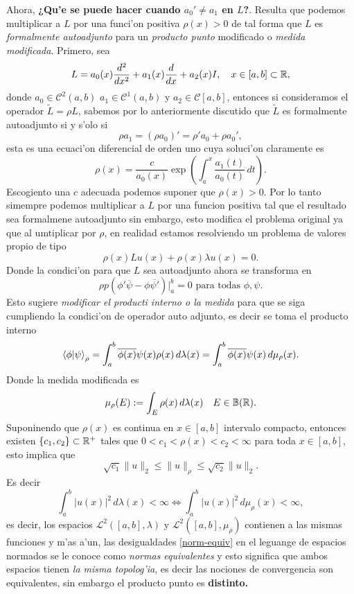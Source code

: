 \documentclass[main.tex]{subfiles}
\begin{document}
\noindent Ahora, \textbf{¿Qu'e se puede hacer cuando $a_{0}'\neq a_{1}$ en $L$?}. Resulta que podemos multiplicar a $L$ por una funci'on positiva $\rho(x)>0$ de tal forma que $L$ es \emph{formalmente autoadjunto} para un \emph{producto punto} modificado o \emph{medida modificada}. Primero, sea
\[
L=a_0(x)\frac{d^2}{dx^2}+a_1(x)\frac{d}{dx}+a_2(x)I,\quad x\in [a,b]\subset\mathbb R ,
\]
\noindent donde $a_{0}\in\mathcal{C}^{2}(a,b)$ $a_{1}\in\mathcal{C}^{1}(a,b)$ y $a_{2}\in\mathcal{C}[a,b]$, entonces si consideramos el operador $\tilde{L}=\rho L$, sabemos por lo anteriormente discutido que $\tilde{L}$ es formalmente autoadjunto si y s'olo si
\[
  \rho a_{1}=(\rho a_{0})'=\rho'a_{0}+\rho a_{0}',
\]
esta es una ecuaci'on diferencial de orden uno cuya soluci'on claramente es
\[
  \rho(x)=\frac{c}{a_{0}(x)}\exp\left(\int_{a}^{x}\frac{a_{1}(t)}{a_{0}(t)}\,dt\right).
\]
Escogiento una $c$ adecuada podemos suponer que $\rho(x)>0$. Por lo tanto simempre podemos multiplicar a $L$ por una funcion positiva tal que el resultado sea formalmene autoadjunto sin embargo, esto modifica el problema original ya que al umtiplicar por $\rho$, en realidad estamos resolviendo un problema de valores propio de tipo
\[
  \rho(x)Lu(x)+\rho(x)\lambda u(x)=0.
\]
\noindent Donde la condici'on para que $L$ sea autoadjunto ahora se transforma en
\[
  \rho p(\phi'\overline{\psi}-\phi\overline{\psi'})|_{a}^{b}=0\text{ para todas }\phi,\psi.
\]
Esto sugiere \emph{modificar el producti interno o  la medida} para que se siga cumpliendo la condici'on de operador auto adjunto, es decir se toma el producto interno
\begin{equation} \braket{\phi|\psi}_{\rho}=\int_{a}^{b}\overline{\phi(x)}\psi(x)\rho(x)\,d\lambda(x)=\int_{a}^{b}\overline{\phi(x)}\psi(x)\,d\mu_{\rho}(x).
\end{equation}
\noindent Donde la medida modificada es
\[
  \mu_{\rho}(E):=\int_{E}\rho(x)\,d\lambda(x)\quad E\in\mathbb{B}(\mathbb R ).
\]
\obs Suponinendo que $\rho(x)$ es continua en $x\in[a,b]$ intervalo compacto, entonces existen $\{c_{1},c_{2}\}\subset\mathbb R ^{+}$ tales que $0<c_{1}<\rho(x)<c_{2}<\infty$ para toda $x\in[a,b]$, esto implica que
\begin{equation}\label{norm-equiv}
  \sqrt{c_{1}}\|u\|_{2}\leq\|u\|_{\rho}\leq\sqrt{c_{2}}\|u\|_{2}.
\end{equation}
Es decir
\[
  \int_{a}^{b}|u(x)|^{2}\,d\lambda(x)<\infty\iff \int_{a}^{b}|u(x)|^{2}\,d\mu_{\rho}(x)<\infty,
\]
es decir, los espacios $\mathcal{L}^{2}([a,b],\lambda)$ y $\mathcal{L}^{2}([a,b],\mu_{\rho})$ contienen a las mismas funciones y m'as a'un, las desigualdades \ref{norm-equiv} en el leguange de espacios normados se le conoce como \emph{normas equivalentes} y esto significa que ambos espacios tienen \emph{la misma topolog'ia}, es decir las nociones de convergencia son equivalentes, sin embargo el producto punto es \textbf{distinto.}
\end{document}
